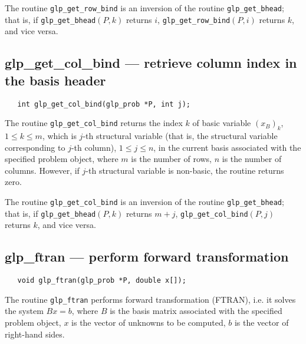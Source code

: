 
The routine \verb|glp_get_row_bind| is an inversion of the routine
\verb|glp_get_bhead|; that is, if \linebreak
\verb|glp_get_bhead|$(P,k)$ returns $i$,
\verb|glp_get_row_bind|$(P,i)$ returns $k$, and vice versa.

\subsection{glp\_get\_col\_bind --- retrieve column index in the basis
header}

\synopsis

\begin{verbatim}
   int glp_get_col_bind(glp_prob *P, int j);
\end{verbatim}

\returns

The routine \verb|glp_get_col_bind| returns the index $k$ of basic
variable $(x_B)_k$, $1\leq k\leq m$, which is $j$-th structural
variable (that is, the structural variable corresponding to $j$-th
column), $1\leq j\leq n$, in the current basis associated with the
specified problem object, where $m$ is the number of rows, $n$ is the
number of columns. However, if $j$-th structural variable is non-basic,
the routine returns zero.


The routine \verb|glp_get_col_bind| is an inversion of the routine
\verb|glp_get_bhead|; that is, if \linebreak
\verb|glp_get_bhead|$(P,k)$ returns $m+j$,
\verb|glp_get_col_bind|$(P,j)$ returns $k$, and vice versa.

\subsection{glp\_ftran --- perform forward transformation}

\synopsis

\begin{verbatim}
   void glp_ftran(glp_prob *P, double x[]);
\end{verbatim}

\description

The routine \verb|glp_ftran| performs forward transformation (FTRAN),
i.e. it solves the system $Bx=b$, where $B$ is the basis matrix
associated with the specified problem object, $x$ is the vector of
unknowns to be computed, $b$ is the vector of right-hand sides.

